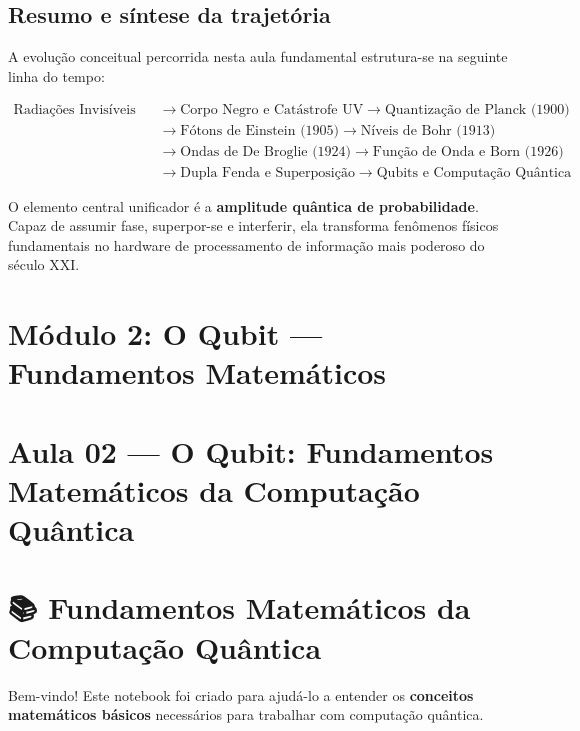 \documentclass[
  brazilian,
]{report}
\begin{document}
\section{Resumo e síntese da
trajetória}\label{resumo-e-suxedntese-da-trajetuxf3ria}

A evolução conceitual percorrida nesta aula fundamental estrutura-se na
seguinte linha do tempo:

\[\begin{aligned}
\text{Radiações Invisíveis (1800)} &\longrightarrow \text{Corpo Negro e Catástrofe UV} \longrightarrow \text{Quantização de Planck (1900)} \\
&\longrightarrow \text{Fótons de Einstein (1905)} \longrightarrow \text{Níveis de Bohr (1913)} \\
&\longrightarrow \text{Ondas de De Broglie (1924)} \longrightarrow \text{Função de Onda e Born (1926)} \\
&\longrightarrow \text{Dupla Fenda e Superposição} \longrightarrow \text{Qubits e Computação Quântica}
\end{aligned}\]

O elemento central unificador é a \textbf{amplitude quântica de
probabilidade}. Capaz de assumir fase, superpor-se e interferir, ela
transforma fenômenos físicos fundamentais no hardware de processamento
de informação mais poderoso do século XXI.

\newpage

\chapter{Módulo 2: O Qubit --- Fundamentos
Matemáticos}\label{muxf3dulo-2-o-qubit-fundamentos-matemuxe1ticos}

\chapter{Aula 02 --- O Qubit: Fundamentos Matemáticos da Computação
Quântica}\label{aula-02-o-qubit-fundamentos-matemuxe1ticos-da-computauxe7uxe3o-quuxe2ntica}

\chapter{📚 Fundamentos Matemáticos da Computação
Quântica}\label{fundamentos-matemuxe1ticos-da-computauxe7uxe3o-quuxe2ntica}

Bem-vindo! Este notebook foi criado para ajudá-lo a entender os
\textbf{conceitos matemáticos básicos} necessários para trabalhar com
computação quântica.
\end{document}
